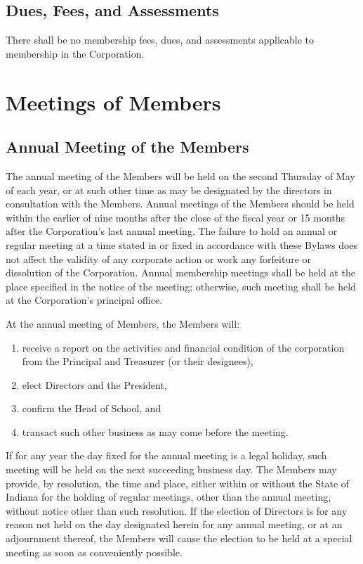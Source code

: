 \documentclass[
]{book}
\begin{document}
\section{Dues, Fees, and Assessments}\label{dues-fees-and-assessments}

There shall be no membership fees, dues, and assessments applicable to
membership in the Corporation.

\chapter{Meetings of Members}\label{meetings-of-members}

\section{Annual Meeting of the Members}\label{annual-meeting-of-the-members}

The annual meeting of the Members will be held on the second Thursday
of May of each year, or at such other time as may be designated by the
directors in consultation with the Members. Annual meetings of the
Members should be held within the earlier of nine months after the
close of the fiscal year or 15 months after the Corporation's last
annual meeting. The failure to hold an annual or regular meeting at a
time stated in or fixed in accordance with these Bylaws does not
affect the validity of any corporate action or work any forfeiture or
dissolution of the Corporation. Annual membership meetings shall be
held at the place specified in the notice of the meeting; otherwise,
such meeting shall be held at the Corporation's principal office.

At the annual meeting of Members, the Members will:

\begin{enumerate}
\def\labelenumi{\alph{enumi})}
\item
  receive a report on the activities and financial condition of the
  corporation from the Principal and Treasurer (or their designees),
\item
  elect Directors and the President,
\item
  confirm the Head of School, and
\item
  transact such other business as may come before the meeting.
\end{enumerate}

If for any year the day fixed for the annual meeting is a legal
holiday, such meeting will be held on the next succeeding business
day. The Members may provide, by resolution, the time and place,
either within or without the State of Indiana for the holding of
regular meetings, other than the annual meeting, without notice other
than such resolution. If the election of Directors is for any reason
not held on the day designated herein for any annual meeting, or at an
adjournment thereof, the Members will cause the election to be held at
a special meeting as soon as conveniently possible.
\end{document}
